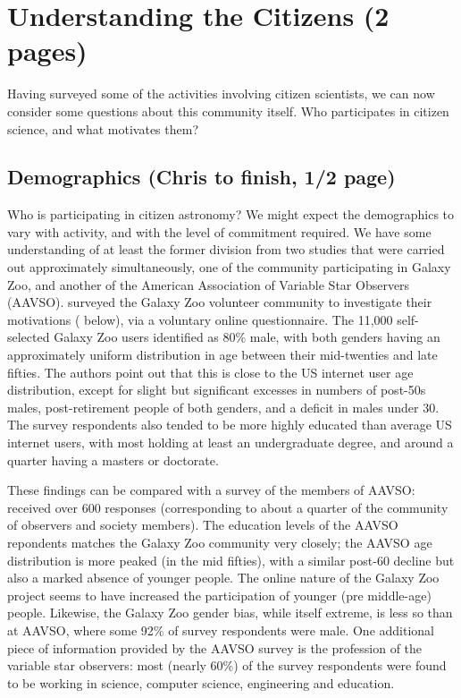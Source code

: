 \documentclass{ar2e}
\begin{document}

\section{Understanding the Citizens (2 pages)}
\label{sec:crowd}

Having surveyed some of the activities involving citizen scientists, we can
now consider some questions about this community itself. Who participates in
citizen science, and what motivates them?



\subsection{Demographics (Chris to finish, 1/2 page)}
\label{sec:crowd:demographics}

Who is participating in citizen astronomy? We might expect the demographics to
vary with activity, and with the level of commitment required. We have some
understanding of at least the former division from two studies that were
carried out approximately simultaneously, one of the community  participating
in Galaxy Zoo, and another of the  American Association of Variable Star
Observers (AAVSO).  \citet{Rad++13} surveyed the Galaxy Zoo volunteer
community to investigate their motivations (
below), via a voluntary online questionnaire. The 11,000 self-selected Galaxy
Zoo users identified as 80\% male, with both genders having an approximately
uniform distribution in age between their mid-twenties and late fifties. The
authors point out that this is close to the US internet user age distribution,
except for slight but significant excesses in numbers of post-50s males,
post-retirement people of both genders, and a deficit in males under 30. The
survey respondents  also tended to be more highly educated than average US
internet users, with most holding at least an undergraduate degree, and around
a quarter having a masters or doctorate. 

These findings can be compared with a survey of the members of AAVSO:
\citet{P+P2012} received over 600 responses  (corresponding to about a quarter
of the community of observers and society members). The education levels of
the AAVSO repondents matches the Galaxy Zoo community very closely; the AAVSO
age distribution is more peaked (in the mid fifties), with a similar post-60
decline but also a marked absence of younger people. The online nature of the
Galaxy Zoo project seems to have increased the participation of younger (pre
middle-age) people. Likewise, the Galaxy Zoo gender bias, while itself
extreme, is less so than at AAVSO, where some 92\% of survey respondents were
male. One additional piece of information provided by the AAVSO survey is the
profession of the variable star observers: most (nearly 60\%) of the survey
respondents were found to be working in science, computer science, engineering
and education.
\end{document}
